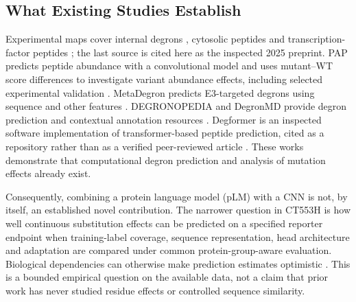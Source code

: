 \subsection{What Existing Studies Establish}
Experimental maps cover internal degrons \citep{zhang2023}, cytosolic peptides
\citep{voutsinos2026} and transcription-factor peptides \citep{larsen2025}; the last source is cited here
as the inspected 2025 preprint. PAP predicts peptide abundance with a convolutional model and uses
mutant--WT score differences to investigate variant abundance effects, including selected experimental
validation \citep{voutsinos2026}. MetaDegron predicts E3-targeted degrons using sequence and other
features \citep{zheng2024}. DEGRONOPEDIA and DegronMD provide degron prediction and contextual
annotation resources \citep{degronopedia,degronmd}. Degformer is an inspected software implementation
of transformer-based peptide prediction, cited as a repository rather than as a verified peer-reviewed
article \citep{degformer}. These works demonstrate that computational degron prediction and analysis
of mutation effects already exist.

Consequently, combining a protein language model (pLM) with a CNN is not, by itself, an established
novel contribution. The narrower question in CT553H is how well continuous substitution effects can be
predicted on a specified reporter endpoint when training-label coverage, sequence representation,
head architecture and adaptation are compared under common protein-group-aware evaluation.
Biological dependencies can otherwise make prediction estimates optimistic
\citep{bernett2024}. This is a bounded empirical question on the available data, not a claim that prior
work has never studied residue effects or controlled sequence similarity.

